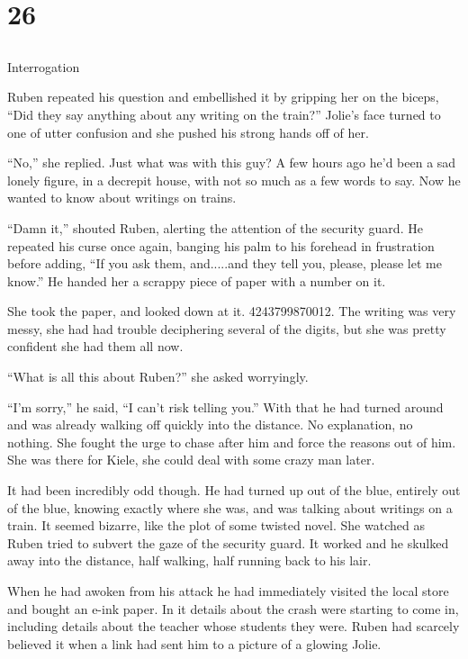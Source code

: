 \chapter{26}
\section{}
Interrogation  

Ruben repeated his question and embellished it by gripping her on the biceps, ``Did they say anything about any writing on the train?''  Jolie's face turned to one of utter confusion and she pushed his strong hands off of her.

``No,'' she replied.  Just what was with this guy?  A few hours ago he'd been a sad lonely figure, in a decrepit house, with not so much as  a few words to say.  Now he wanted to know about writings on trains.  

``Damn it,'' shouted Ruben, alerting the attention of the security guard.  He repeated his curse once again, banging his palm to his forehead in frustration before adding, ``If you ask them, and.....and they tell you, please, please let me know.''  He handed her a scrappy piece of paper with a number on it.  

She took the paper, and looked down at it.  4243799870012.  The writing was very messy, she had had trouble deciphering several of the digits, but she was pretty confident she had them all now.  

``What is all this about Ruben?'' she asked worryingly.

``I'm sorry,'' he said, ``I can't risk telling you.''  With that he had turned around and was already walking off quickly into the distance.  No explanation, no nothing.  She fought the urge to chase after him and force the reasons out of him.  She was there for Kiele, she could deal with some crazy man later.

It had been incredibly odd though.  He had turned up out of the blue, entirely out of the blue, knowing exactly where she was, and was talking about writings on a train.  It seemed bizarre, like the plot of some twisted novel.  She watched as Ruben tried to subvert the gaze of the security guard.  It worked and he skulked away into the distance, half walking, half running back to his lair. 

When he had awoken from his attack he had immediately visited the local store and bought an e-ink paper.  In it details about the crash were starting to come in, including details about the teacher whose students they were.  Ruben had scarcely believed it when a link had sent him to a picture of a glowing Jolie.  

